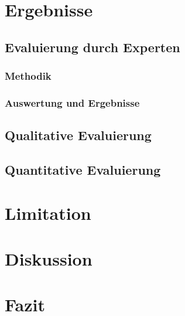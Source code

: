 \documentclass[12pt,letterpaper,ngerman]{article}
\begin{document}
\section{Ergebnisse}
\subsection{Evaluierung durch Experten}
\subsubsection{Methodik}
\subsubsection{Auswertung und Ergebnisse}
\subsection{Qualitative Evaluierung} 
\subsection{Quantitative Evaluierung} 
\section{Limitation}
\section{Diskussion}
\section{Fazit}
\end{document}
